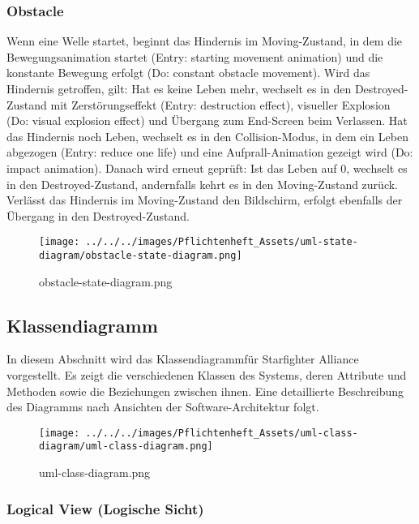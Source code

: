 \documentclass[10pt]{article}
\begin{document}
\newpage
\subsubsection{Obstacle}
Wenn eine Welle startet, beginnt das Hindernis im Moving-Zustand, in dem die Bewegungsanimation startet (Entry: starting movement animation) und die konstante Bewegung erfolgt (Do: constant obstacle movement).
Wird das Hindernis getroffen, gilt: Hat es keine Leben mehr, wechselt es in den Destroyed-Zustand mit Zerstörungseffekt (Entry: destruction effect), visueller Explosion (Do: visual explosion effect) und Übergang zum End-Screen beim Verlassen. Hat das Hindernis noch Leben, wechselt es in den Collision-Modus, in dem ein Leben abgezogen (Entry: reduce one life) und eine Aufprall-Animation gezeigt wird (Do: impact animation). Danach wird erneut geprüft: Ist das Leben auf 0, wechselt es in den Destroyed-Zustand, andernfalls kehrt es in den Moving-Zustand zurück.
Verlässt das Hindernis im Moving-Zustand den Bildschirm, erfolgt ebenfalls der Übergang in den Destroyed-Zustand.
\begin{figure}
	\centering
	\texttt{[image: ../../../images/Pflichtenheft\_Assets/uml-state-diagram/obstacle-state-diagram.png]}\\
	\caption{obstacle-state-diagram.png}
\end{figure}

\newpage
	\subsection{Klassendiagramm}

In diesem Abschnitt wird das Klassendiagramm\footnotemark[4] für Starfighter Alliance vorgestellt. Es zeigt die verschiedenen Klassen des Systems, deren Attribute und Methoden sowie die Beziehungen zwischen ihnen. Eine detaillierte Beschreibung des Diagramms nach Ansichten der Software-Architektur folgt.


\begin{figure}
\centering
	\texttt{[image: ../../../images/Pflichtenheft\_Assets/uml-class-diagram/uml-class-diagram.png]}\\
	\caption{uml-class-diagram.png}
\end{figure}
\newpage
\subsubsection{Logical View (Logische Sicht)}
\end{document}
